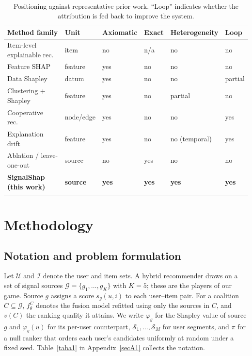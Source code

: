 \documentclass[pdflatex,sn-mathphys-num]{sn-jnl}%
\theoremstyle{thmstyleone}%
\theoremstyle{thmstyletwo}%
\theoremstyle{thmstylethree}%
\newcommand{\Gset}{\mathcal{G}}
\newcommand{\Uset}{\mathcal{U}}
\newcommand{\Iset}{\mathcal{I}}
\begin{document}
\begin{table}[t]
\caption{Positioning against representative prior work. ``Loop'' indicates whether the attribution is fed back to improve the system.}\label{tab1}
\begin{tabular}{@{}llllll@{}}
\toprule
Method family & Unit & Axiomatic & Exact & Heterogeneity & Loop \\
\midrule
Item-level explainable rec.\ \cite{zhang2020}   & item     & no  & n/a & no  & no  \\
Feature SHAP \cite{lundberg2017,lundberg2020}   & feature  & yes & no  & no  & no  \\
Data Shapley \cite{ghorbani2019}                & datum    & yes & no  & no  & partial \\
Clustering + Shapley \cite{louhichi2023,louhichi2025} & feature & yes & no & partial & no \\
Cooperative rec.\ \cite{louhichi2026,nesmaoui2025} & node/edge & yes & no & no & yes \\
Explanation drift \cite{nesmaoui2026drift}      & feature  & yes & no  & no (temporal) & yes \\
Ablation / leave-one-out                        & source   & no  & yes & no  & no  \\
\textbf{SignalShap (this work)}                 & \textbf{source} & \textbf{yes} & \textbf{yes} & \textbf{yes} & \textbf{yes} \\
\botrule
\end{tabular}
\end{table}

\section{Methodology}\label{sec3}

\subsection{Notation and problem formulation}\label{subsec3_1}

Let $\Uset$ and $\Iset$ denote the user and item sets. A hybrid recommender draws on a set of signal sources $\Gset=\{g_1,\dots,g_K\}$ with $K=5$; these are the players of our game. Source $g$ assigns a score $s_g(u,i)$ to each user--item pair. For a coalition $C\subseteq\Gset$, $f_\theta^{C}$ denotes the fusion model refitted using only the sources in $C$, and $v(C)$ the ranking quality it attains. We write $\varphi_g$ for the Shapley value of source $g$ and $\varphi_g(u)$ for its per-user counterpart, $\mathcal{S}_1,\dots,\mathcal{S}_M$ for user segments, and $\pi$ for a null ranker that orders each user's candidates uniformly at random under a fixed seed. Table~\ref{taba1} in Appendix~\ref{secA1} collects the notation.
\end{document}
